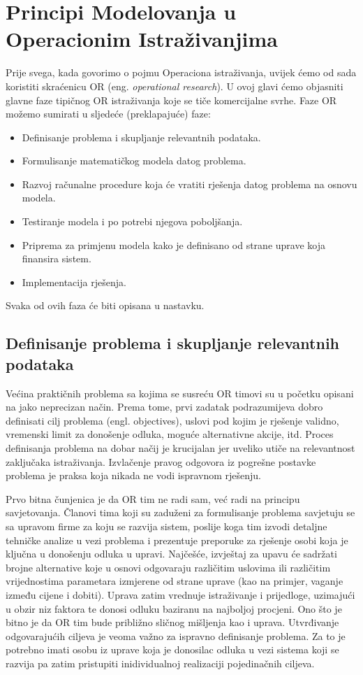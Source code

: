 \documentclass[a4paper, utf8, 11pt, colorlinks]{book}
\begin{document}
 
\chapter{Principi Modelovanja u Operacionim Istraživanjima}
Prije svega, kada govorimo o pojmu Operaciona istraživanja, uvijek ćemo od sada koristiti skraćenicu OR (eng. \emph{operational research}). 
U ovoj glavi ćemo objasniti   glavne faze tipičnog OR istraživanja koje se tiče komercijalne svrhe. Faze OR možemo sumirati u sljedeće (preklapajuće) faze: 
\begin{itemize}
    \item Definisanje problema i skupljanje relevantnih podataka.
    \item Formulisanje matematičkog modela datog problema.
    \item Razvoj računalne procedure koja će vratiti rješenja datog problema na osnovu modela.
    \item Testiranje modela i po potrebi njegova poboljšanja.
    \item Priprema za primjenu modela kako je definisano od strane uprave koja finansira sistem.
    \item Implementacija rješenja.
\end{itemize}
 Svaka od ovih faza će biti opisana u nastavku.
 
 \section{Definisanje problema i skupljanje relevantnih podataka}
 
Većina praktičnih problema sa kojima se susreću OR timovi su u početku opisani na jako neprecizan način. Prema tome, prvi zadatak podrazumijeva dobro definisati  cilj problema (engl. objectives), uslovi pod kojim je rješenje validno,  vremenski limit za donošenje odluka, moguće alternativne akcije, itd. Proces definisanja problema na dobar načij je krucijalan jer uveliko utiče na relevantnost zaključaka istraživanja. Izvlačenje pravog odgovora iz pogrešne postavke problema je praksa koja nikada ne vodi ispravnom rješenju.  

Prvo bitna čunjenica je da OR tim ne radi sam, već radi na principu savjetovanja. Članovi tima koji su zaduženi za formulisanje problema savjetuju se sa upravom firme za koju se razvija sistem, poslije koga tim izvodi detaljne tehničke analize u vezi problema i prezentuje preporuke za rješenje  osobi koja je ključna u donošenju odluka u upravi.  
Najčešće, izvještaj za upavu će sadržati brojne alternative koje u osnovi odgovaraju različitim uslovima ili različitim  vrijednostima parametara izmjerene od strane uprave (kao na primjer, vaganje između cijene i dobiti). Uprava zatim vrednuje istraživanje i prijedloge, uzimajući u obzir  niz faktora te donosi odluku baziranu na najboljoj procjeni. Ono što je bitno je da OR tim bude približno sličnog mišljenja kao i uprava. Utvrđivanje odgovarajućih ciljeva je veoma važno za ispravno definisanje problema.  Za to je potrebno imati osobu iz uprave koja je donosilac odluka u vezi sistema koji se razvija pa zatim pristupiti inidividualnoj realizaciji pojedinačnih ciljeva.
\end{document}
